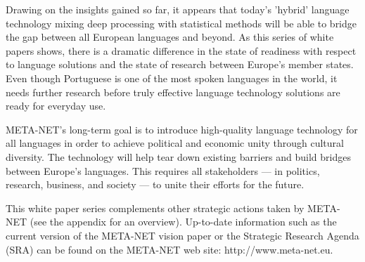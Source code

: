 \begin{multicols}{2}

   Drawing on the insights gained so far, it appears that today’s 'hybrid' language technology mixing deep processing with statistical methods will be able to bridge the gap between all European languages and beyond. As this series of white papers shows, there is a dramatic difference in the state of readiness with respect to language solutions and the state of research between Europe’s member states. Even though Portuguese is one of the most spoken languages in the world, it needs further research before truly effective language technology solutions are ready for everyday use. 

    META-NET’s long-term goal is to introduce high-quality language technology for all languages in order to achieve political and economic unity through cultural diversity. The technology will help tear down existing barriers and build bridges between Europe’s languages. This requires all stakeholders — in politics, research, business, and society — to unite their efforts for the future.

    This white paper series complements other strategic actions taken by META-NET (see the appendix for an overview). Up-to-date information such as the current version of the META-NET vision paper\cite{Meta1} or the Strategic Research Agenda (SRA) can be found on the META-NET web site: http://www.meta-net.eu.
\end{multicols}

\clearpage


